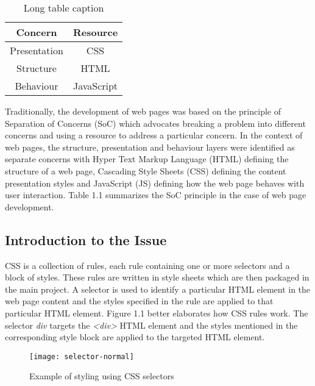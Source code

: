 \documentclass[12pt]{article}
\begin{document}
\vspace{0.5cm}

\begin{table}[h]
	\centering
	\begin{tabular}{|c|c|}
		\hline
		\textbf{Concern} & \textbf{Resource} \\ 
		\hline
		Presentation & CSS \\
		\hline 
		Structure & HTML \\
		\hline
		Behaviour & JavaScript \\
		\hline
	\end{tabular}
	\caption{Long table caption}
\end{table}

\vspace{0.5cm}

Traditionally, the development of web pages was based on the principle of Separation of Concerns (SoC) which advocates breaking a problem into different concerns and using a resource to address a particular concern. In the context of web pages, the structure, presentation and behaviour layers were identified as separate concerns with Hyper Text Markup Language (HTML) defining the structure of a web page, Cascading Style Sheets (CSS) defining the content presentation styles and JavaScript (JS) defining how the web page behaves with user interaction. Table 1.1 summarizes the SoC principle in the case of web page development.

\subsection{Introduction to the Issue}
CSS is a collection of rules, each rule containing one or more selectors and a block of styles. These rules are written in style sheets which are then packaged in the main project. A selector is used to identify a particular HTML element in the web page content and the styles specified in the rule are applied to that particular HTML element. Figure 1.1 better elaborates how CSS rules work. The selector \textit{div} targets the \textit{<div>} HTML element and the styles mentioned in the corresponding style block are applied to the targeted HTML element.

\vspace{0.5cm}

\begin{figure}[h]
\texttt{[image: selector-normal]}
\centering
\caption{Example of styling using CSS selectors}
\end{figure}
\end{document}

